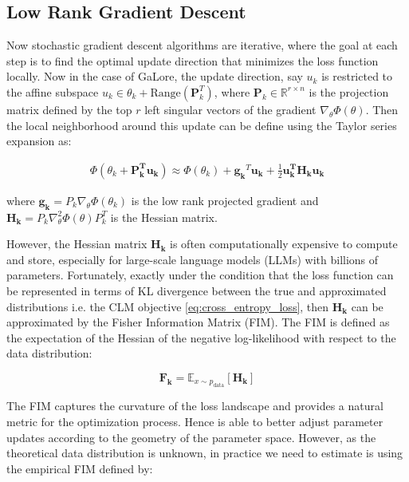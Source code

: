 \subsection{Low Rank Gradient Descent}

Now stochastic gradient descent algorithms are iterative, where the goal at each step is to find the optimal update direction that minimizes the loss function locally. Now in the case of GaLore, the update direction, say \(u_{k}\) is restricted to the affine subspace \(u_{k} \in {\theta_{k}} + \text{Range} \left(\mathbf{P}_{k}^{T}\right)\), where \(\mathbf{P}_{k} \in \mathbb{R}^{r\times n}\) is the projection matrix defined by the top \(r\) left singular vectors of the gradient \(\nabla_{\theta} \Phi(\theta)\). Then the local neighborhood around this update can be define using the Taylor series expansion as:

\begin{eqnarray}
\Phi(\theta_{k} + \mathbf{P_{k}^T u_{k}}) \approx \Phi(\theta_{k}) + \mathbf{g_{k}}^{T}\mathbf{u_{k}} + \frac{1}{2} \mathbf{u_{k}^{T} \mathbf{H_{k}}  u_{k}}
\label{eq:taylor_series_expansion}
\end{eqnarray}

where \(\mathbf{g_{k}} = P_{k}\nabla_{\theta} \Phi(\theta_{k})\) is the low rank projected gradient and \(\mathbf{H_{k}} = P_{k}\nabla^2_{\theta} \Phi(\theta) P_{k}^T\) is the Hessian matrix.

However, the Hessian matrix \(\mathbf{H_{k}}\) is often computationally expensive to compute and store, especially for large-scale language models (LLMs) with billions of parameters. Fortunately, exactly under the condition that the loss function can be represented in terms of KL divergence between the true and approximated distributions i.e. the CLM objective \ref{eq:cross_entropy_loss}, then \(\mathbf{H_{k}}\) can be approximated by the Fisher Information Matrix (FIM). The FIM is defined as the expectation of the Hessian of the negative log-likelihood with respect to the data distribution:

\[
\mathbf{F_{k}} = \mathbb{E}_{x \sim p_{\text{data}}} \left[ \mathbf{H_{k}} \right]
\]

The FIM captures the curvature of the loss landscape and provides a natural metric for the optimization process. Hence is able to better adjust parameter updates according to the geometry of the parameter space. However, as the theoretical data distribution is unknown, in practice we need to estimate is using the empirical FIM \citep{martensNewPerspectiveNatural2014} defined by:

